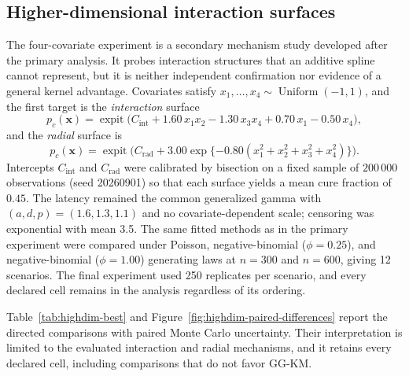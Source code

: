 
\subsection{Higher-dimensional interaction surfaces}\label{sec:highdim-simulation}

The four-covariate experiment is a secondary mechanism study developed
after the primary analysis. It probes interaction structures that
an additive spline cannot represent, but it is neither
independent confirmation nor evidence of a general kernel
advantage. Covariates satisfy
$x_1,\dots,x_4\sim\operatorname{Uniform}(-1,1)$, and the first
target is the \emph{interaction} surface
\begin{equation}
p_c(\bm{x})=\operatorname{expit}\bigl(C_{\mathrm{int}}+1.60\,x_1x_2-1.30\,x_3x_4+0.70\,x_1-0.50\,x_4\bigr),
\end{equation}
and the \emph{radial} surface is
\begin{equation}
p_c(\bm{x})=\operatorname{expit}\bigl(C_{\mathrm{rad}}+3.00\exp\{-0.80(x_1^2+x_2^2+x_3^2+x_4^2)\}\bigr).
\end{equation}
Intercepts $C_{\mathrm{int}}$ and $C_{\mathrm{rad}}$ were
calibrated by bisection on a fixed sample of $200\,000$
observations (seed 20260901) so that each surface yields a mean
cure fraction of $0.45$. The latency remained the common
generalized gamma with $(a,d,p)=(1.6,1.3,1.1)$ and no
covariate-dependent scale; censoring was exponential with mean
3.5. The same fitted methods as in the primary experiment were
compared under Poisson, negative-binomial ($\phi=0.25$), and
negative-binomial ($\phi=1.00$) generating laws at $n=300$ and
$n=600$, giving 12 scenarios. The final experiment used 250
replicates per scenario, and every declared cell remains in the
analysis regardless of its ordering.

Table~\ref{tab:highdim-best} and
Figure~\ref{fig:highdim-paired-differences} report the directed
comparisons with paired Monte Carlo uncertainty. Their
interpretation is limited to the evaluated interaction and
radial mechanisms, and it retains every declared cell,
including comparisons that do not favor GG-KM.

